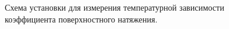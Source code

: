 \documentclass[a4paper,12pt]{article} %
\begin{document}
	\begin{figure}[H]
		\caption{Схема установки для измерения температурной зависимости коэффициента поверхностного натяжения.}
		\label{ris:ustanovka}
	\end{figure}
\end{document}
